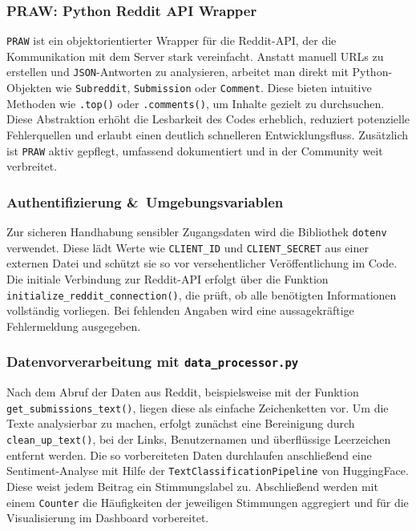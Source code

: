\subsubsection{PRAW: Python Reddit API Wrapper}
\texttt{PRAW} ist ein objektorientierter Wrapper für die Reddit-API, der die Kommunikation mit dem Server stark vereinfacht.
Anstatt manuell URLs zu erstellen und \texttt{JSON}-Antworten zu analysieren, arbeitet man direkt mit Python-Objekten wie \texttt{Subreddit}, \texttt{Submission} oder \texttt{Comment}.
Diese bieten intuitive Methoden wie \texttt{.top()} oder \texttt{.comments()}, um Inhalte gezielt zu durchsuchen.
Diese Abstraktion erhöht die Lesbarkeit des Codes erheblich, reduziert potenzielle Fehlerquellen und erlaubt einen deutlich schnelleren Entwicklungsfluss.
Zusätzlich ist \texttt{PRAW} aktiv gepflegt, umfassend dokumentiert und in der Community weit verbreitet.

\subsubsection{Authentifizierung \&~Umgebungsvariablen}
Zur sicheren Handhabung sensibler Zugangsdaten wird die Bibliothek \texttt{dotenv} verwendet.
Diese lädt Werte wie \texttt{CLIENT\_ID} und \texttt{CLIENT\_SECRET} aus einer externen Datei und schützt sie so vor versehentlicher Veröffentlichung im Code.
Die initiale Verbindung zur Reddit-API erfolgt über die Funktion \texttt{initialize\_reddit\_connection()}, die prüft, ob alle benötigten Informationen vollständig vorliegen.
Bei fehlenden Angaben wird eine aussagekräftige Fehlermeldung ausgegeben.

\subsubsection{Datenvorverarbeitung mit \texttt{data\_processor.py}}
Nach dem Abruf der Daten aus Reddit, \newline
beispielsweise mit der Funktion \texttt{get\_submissions\_text()}, liegen diese als einfache Zeichenketten vor.
Um die Texte analysierbar zu machen, erfolgt zunächst eine Bereinigung durch \texttt{clean\_up\_text()}, bei der Links, Benutzernamen und überflüssige Leerzeichen entfernt werden.
Die so vorbereiteten Daten durchlaufen anschließend eine Sentiment-Analyse \newline
mit Hilfe der \texttt{TextClassificationPipeline} von HuggingFace.
Diese weist jedem Beitrag ein Stimmungslabel zu.
Abschließend werden mit einem \texttt{Counter} die Häufigkeiten der jeweiligen Stimmungen aggregiert und für die Visualisierung im Dashboard vorbereitet.

